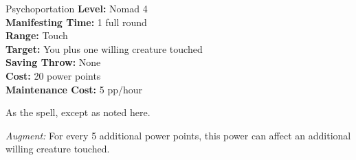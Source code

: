 {Psychoportation}
{
	\textbf{Level:}
	Nomad 4\\
	\textbf{Manifesting Time:}
	1 full round\\
	\textbf{Range:}
	Touch\\
	\textbf{Target:}
	You plus one willing creature touched\\
	\textbf{Saving Throw:}
	None\\
	\textbf{Cost:}
	20 power points\\
	\textbf{Maintenance Cost:}
	5 pp/hour\\
}
{
	As the  spell, except as noted here.

	\textit{Augment:} For every 5 additional power points, this power can affect an additional willing creature touched.
}
